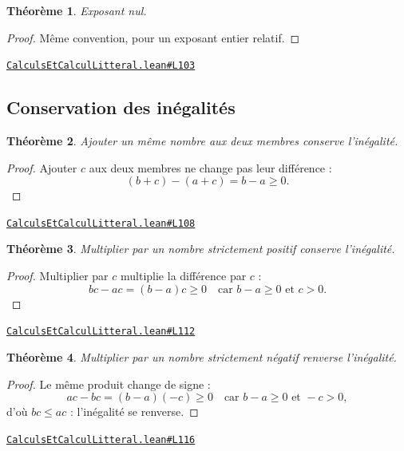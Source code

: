 \documentclass[11pt,a4paper]{article}
\theoremstyle{definition}
\theoremstyle{plain}
\newtheorem{theoreme}{Théorème}
\newcommand{\source}[2]{\par\smallskip\noindent\hfill{\footnotesize\href{#1}{\texttt{#2}}}\par\smallskip}
\begin{document}
\begin{theoreme}
Exposant nul.
\end{theoreme}

\begin{proof}
Même convention, pour un exposant entier relatif.
\end{proof}
\source{https://github.com/Commutator-IO/learn-lean/blob/main/cours/01-college/01-nombres-et-calculs/CalculsEtCalculLitteral.lean\#L103}{CalculsEtCalculLitteral.lean\#L103}

\subsection{Conservation des inégalités}

\begin{theoreme}
Ajouter un même nombre aux deux membres conserve l'inégalité.
\end{theoreme}

\begin{proof}
Ajouter $c$ aux deux membres ne change pas leur différence :
\[
(b + c) - (a + c) = b - a \ge 0 .
\]
\end{proof}
\source{https://github.com/Commutator-IO/learn-lean/blob/main/cours/01-college/01-nombres-et-calculs/CalculsEtCalculLitteral.lean\#L108}{CalculsEtCalculLitteral.lean\#L108}

\begin{theoreme}
Multiplier par un nombre strictement positif conserve l'inégalité.
\end{theoreme}

\begin{proof}
Multiplier par $c$ multiplie la différence par $c$ :
\[
bc - ac = (b - a)c \ge 0 \quad\text{car } b - a \ge 0 \text{ et } c > 0 .
\]
\end{proof}
\source{https://github.com/Commutator-IO/learn-lean/blob/main/cours/01-college/01-nombres-et-calculs/CalculsEtCalculLitteral.lean\#L112}{CalculsEtCalculLitteral.lean\#L112}

\begin{theoreme}
Multiplier par un nombre strictement négatif renverse l'inégalité.
\end{theoreme}

\begin{proof}
Le même produit change de signe :
\[
ac - bc = (b - a)(-c) \ge 0 \quad\text{car } b - a \ge 0 \text{ et } -c > 0 ,
\]
d'où $bc \le ac$ : l'inégalité se renverse.
\end{proof}
\source{https://github.com/Commutator-IO/learn-lean/blob/main/cours/01-college/01-nombres-et-calculs/CalculsEtCalculLitteral.lean\#L116}{CalculsEtCalculLitteral.lean\#L116}
\end{document}
